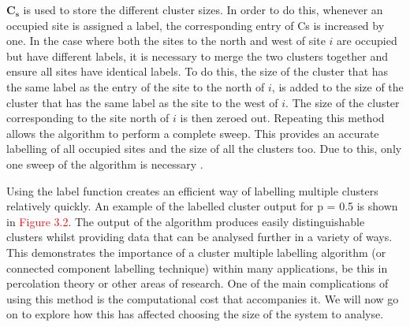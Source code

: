 $\mathbf{C_s}$ is used to store the different cluster sizes. In order to do this, whenever an occupied site is assigned a label, 
the corresponding entry of Cs is increased by one. In the case where both the sites to the north and west of site $i$ are occupied 
but have different labels, it is necessary to merge the two clusters together and ensure all sites have identical labels. 
To do this, the size of the cluster that has the same label as the entry of the site to the north of $i$, is
added to the size of the cluster that has the same label as the site to the west of $i$. The size of the cluster corresponding to the site
north of $i$ is then zeroed out. Repeating this method allows the algorithm to perform a complete sweep. 
This provides an accurate labelling of all occupied sites and the size of all the clusters too. Due to this, only one sweep of the
algorithm is necessary \cite{hoshen1976percolation}.

Using the label function creates an efficient way of labelling multiple clusters relatively quickly. 
An example of the labelled cluster output for p = 0.5 is shown in \textcolor{red}{Figure 3.2}. 
The output of the algorithm produces easily distinguishable clusters whilst providing data that can be analysed further in a variety of ways. 
This demonstrates the importance of a cluster multiple labelling algorithm (or connected component labelling technique) within many applications, 
be this in percolation theory or other areas of research. 
One of the main complications of using this method is the computational cost that accompanies it. 
We will now go on to explore how this has affected choosing the size of the system to analyse.





